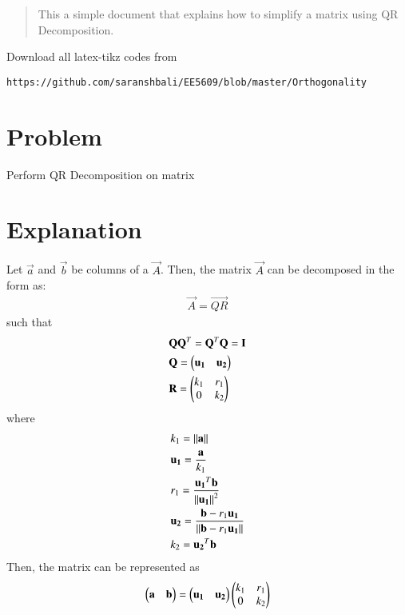 \documentclass[journal,12pt,twocolumn]{IEEEtran}
\begin{document}
%
\begin{abstract}
This a simple document that explains how to simplify a matrix using QR Decomposition.
\end{abstract}
%
%
Download all latex-tikz codes from 
%
\begin{lstlisting}
https://github.com/saranshbali/EE5609/blob/master/Orthogonality
\end{lstlisting}
%
\section{Problem}
Perform QR Decomposition on matrix  
\section{Explanation}
Let $\vec{a}$ and $\vec{b}$ be columns of a $\vec{A}$. Then, the matrix $\vec{A}$ can be decomposed in the form as:
\begin{align}
 \vec{A} = \vec{QR} 
\end{align}
such that  
\begin{align}
	& \mathbf{Q}\mathbf{Q}^T= \mathbf{Q}^T\mathbf{Q} = \mathbf{I} \\ 
	& \mathbf{Q} = \begin{pmatrix}\mathbf{u_1} & \mathbf{u_2}\end{pmatrix}  \\
	& \mathbf{R} = \begin{pmatrix}k_1 & r_1 \\ 0 & k_2\end{pmatrix} 
\end{align}
where
\begin{align}
& k_1 = \left\lVert\mathbf{a}\right\rVert \label{1} \\
& \mathbf{u_1} = \frac{\mathbf{a}}{k_1} \label{2} \\
& r_1 = \frac{\mathbf{u_1}^T\mathbf{b}}{\left\lVert\mathbf{u_1}\right\rVert^2} \label{3} \\
& \mathbf{u_2} = \frac{\mathbf{b}-r_1\mathbf{u_1}}{\left\lVert\mathbf{b}-r_1\mathbf{u_1}\right\rVert} \label{4} \\
& k_2 = \mathbf{u_2}^T\mathbf{b} \label{5}
\end{align}
Then, the matrix can be represented as 
\begin{align}
	\begin{pmatrix}\mathbf{a} & \mathbf{b} \end{pmatrix} = \begin{pmatrix}\mathbf{u_1} & \mathbf{u_2}\end{pmatrix}\begin{pmatrix}k_1 & r_1 \\ 0 & k_2\end{pmatrix} \label{6}
\end{align}
\end{document}
